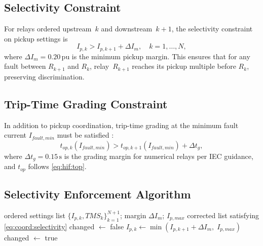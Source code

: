 \documentclass[12pt,a4paper]{article}
\theoremstyle{definition}
\theoremstyle{plain}
\newcommand{\pu}{\,\text{pu}}
\newcommand{\sss}{\,\text{s}}
\begin{document}
\subsection{Selectivity Constraint}
\label{sec:coord:selectivity}

For relays ordered upstream~$k$ and downstream~$k+1$, the selectivity
constraint on pickup settings is
\begin{equation}
  I_{p,k} > I_{p,k+1} + \Delta I_m,
  \quad k = 1, \ldots, N,
  \label{eq:coord:selectivity}
\end{equation}
where $\Delta I_m = 0.20\pu$ is the minimum pickup margin.  This ensures that
for any fault between $R_{k+1}$ and $R_k$, relay~$R_{k+1}$ reaches its
pickup multiple before $R_k$, preserving discrimination.

\subsection{Trip-Time Grading Constraint}
\label{sec:coord:grading}

In addition to pickup coordination, trip-time grading at the minimum fault
current $I_{fault,min}$ must be satisfied \citep{IEC60255-151}:
\begin{equation}
  t_{op,k}(I_{fault,min}) > t_{op,k+1}(I_{fault,min}) + \Delta t_g,
  \label{eq:coord:grading}
\end{equation}
where $\Delta t_g = 0.15\sss$ is the grading margin for numerical relays
per IEC guidance, and $t_{op}$ follows \cref{eq:hif:top}.

\subsection{Selectivity Enforcement Algorithm}
\label{sec:coord:enforcement}

\begin{algorithm}[H]
\caption{Greedy Cascade Selectivity Enforcement}
\label{alg:selcascade}
\begin{algorithmic}[1]
\Require ordered settings list $\{I_{p,k}, TMS_k\}_{k=1}^{N+1}$; margin $\Delta I_m$; $I_{p,max}$
\Ensure corrected list satisfying \cref{eq:coord:selectivity}
\Repeat
  \State changed $\gets$ false
      \State $I_{p,k} \gets \min(I_{p,k+1} + \Delta I_m,\; I_{p,max})$
      \State changed $\gets$ true
    \EndIf
  \EndFor
{}
\end{algorithmic}
\end{algorithm}
\end{document}
